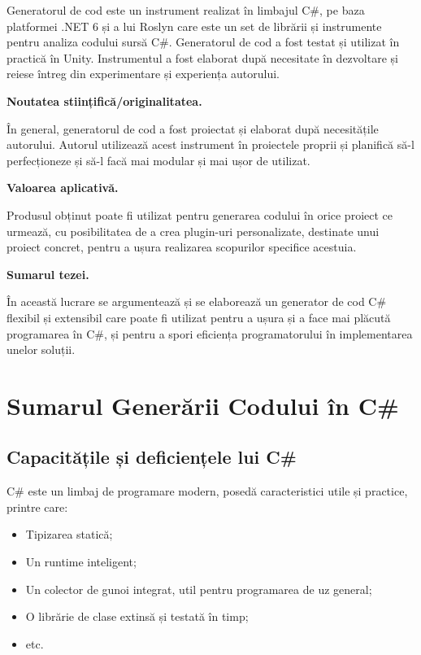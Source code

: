 \documentclass[a4paper,12pt]{report}
\begin{document}
Generatorul de cod este un instrument realizat în limbajul C\#, pe baza platformei {{.}NET} 6 și a lui Roslyn care este un set de librării și instrumente pentru analiza codului sursă C\#.
Generatorul de cod a fost testat și utilizat în practică în Unity.
Instrumentul a fost elaborat după necesitate în dezvoltare și reiese întreg din experimentare și experiența autorului.

\textbf{Noutatea stiințifică/originalitatea.}

În general, generatorul de cod a fost proiectat și elaborat după necesitățile autorului.
Autorul utilizează acest instrument în proiectele proprii și planifică să-l perfecționeze și să-l facă mai modular și mai ușor de utilizat.

\textbf{Valoarea aplicativă.}

Produsul obținut poate fi utilizat pentru generarea codului în orice proiect ce urmează,
cu posibilitatea de a crea plugin-uri personalizate, destinate unui proiect concret,
pentru a ușura realizarea scopurilor specifice acestuia.

\textbf{Sumarul tezei.}

În această lucrare se argumentează și se elaborează un generator de cod C\# flexibil și extensibil care poate fi utilizat pentru a ușura și a face mai plăcută programarea în C\#, și pentru a spori eficiența programatorului în implementarea unelor soluții.


\chapter{Sumarul Generării Codului în C\#}

\section{Capacitățile și deficiențele lui C\#}

{C\# este un limbaj de programare modern, posedă caracteristici utile și practice}\cite{tour_of_csharp}, printre care:
\begin{itemize}
  \item Tipizarea statică;
  \item Un runtime inteligent;
  \item Un colector de gunoi integrat, util pentru programarea de uz general;
  \item O librărie de clase extinsă și testată în timp;
  \item etc.
\end{itemize}
\end{document}
